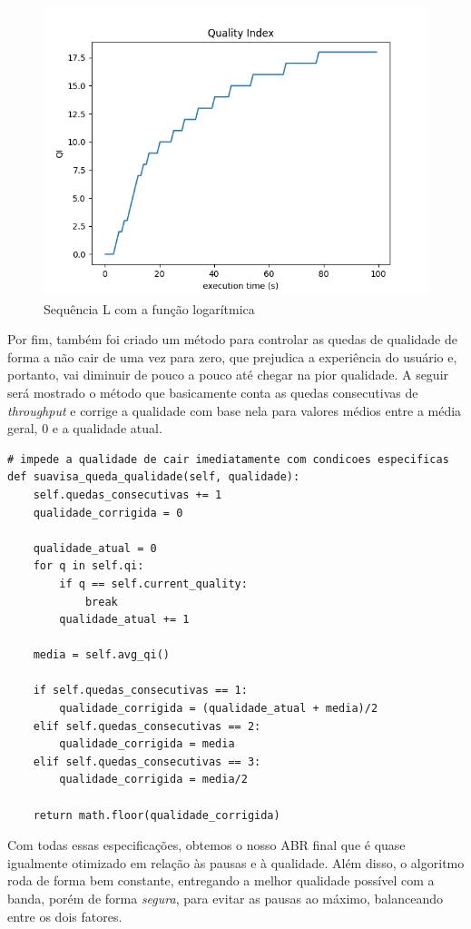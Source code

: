 \documentclass[12pt]{article}
\begin{document}
\begin{figure}[H]
    \centering
    \includegraphics[width=.75\textwidth]{img/qi_L.png}
    \caption{Sequência L com a função logarítmica}
\end{figure}

Por fim, também foi criado um método para controlar as quedas de qualidade de forma a não cair de uma vez para zero, que prejudica a experiência do usuário e, portanto, vai diminuir de pouco a pouco até chegar na pior qualidade. A seguir será mostrado o método que basicamente conta as quedas consecutivas de \textit{throughput} e corrige a qualidade com base nela para valores médios entre a média geral, 0 e a qualidade atual.

\begin{lstlisting}
# impede a qualidade de cair imediatamente com condicoes especificas
def suavisa_queda_qualidade(self, qualidade):
    self.quedas_consecutivas += 1
    qualidade_corrigida = 0

    qualidade_atual = 0
    for q in self.qi:
        if q == self.current_quality:
            break
        qualidade_atual += 1

    media = self.avg_qi()

    if self.quedas_consecutivas == 1:
        qualidade_corrigida = (qualidade_atual + media)/2
    elif self.quedas_consecutivas == 2:
        qualidade_corrigida = media
    elif self.quedas_consecutivas == 3:
        qualidade_corrigida = media/2

    return math.floor(qualidade_corrigida)
\end{lstlisting}

Com todas essas especificações, obtemos o nosso ABR final que é quase igualmente otimizado em relação às pausas e à qualidade. Além disso, o algoritmo roda de forma bem constante, entregando a melhor qualidade possível com a banda, porém de forma \textit{segura}, para evitar as pausas ao máximo, balanceando entre os dois fatores.
\end{document}
